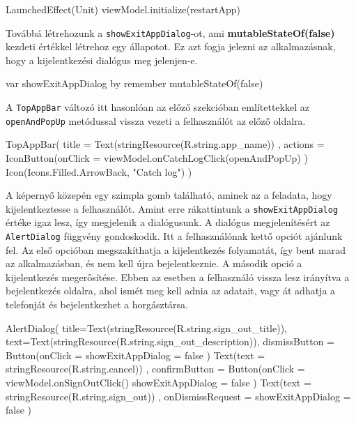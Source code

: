 \begin{java}
LaunchedEffect(Unit) { viewModel.initialize(restartApp) }
\end{java}

Továbbá létrehozunk a \texttt{showExitAppDialog}-ot, ami \textbf{mutableStateOf(false)} kezdeti értékkel létrehoz egy állapotot. Ez azt fogja jelezni az alkalmazásnak, hogy a kijelentkezési dialógus meg jelenjen-e.

\begin{java}
var showExitAppDialog by remember { mutableStateOf(false) }
\end{java}

A \texttt{TopAppBar} változó itt hasonlóan az előző szekcióban említettekkel az
\newline
\texttt{openAndPopUp}
metódussal vissza vezeti a felhasználót az előző oldalra.

\begin{java}
TopAppBar(
    title = { Text(stringResource(R.string.app_name)) },
    actions = {
        IconButton(onClick = { 
            viewModel.onCatchLogClick(openAndPopUp) }) {
            Icon(Icons.Filled.ArrowBack, "Catch log")
        }
    }
)
\end{java}

A képernyő közepén egy szimpla gomb található, aminek az a feladata, hogy kijelentkeztesse a felhasználót. Amint erre rákattintunk a \texttt{showExitAppDialog} értéke igaz lesz, így megjelenik a dialógusunk.
\newpage
A dialógus megjelenítésért az \texttt{AlertDialog} függvény gondoskodik. Itt a felhasználónak kettő opciót ajánlunk fel. Az első opcióban megszakíthatja a kijelentkezés folyamatát, így bent marad az alkalmazásban, és nem kell újra bejelentkeznie. A második opció a kijelentkezés megerősítése. Ebben az esetben a felhasználó vissza lesz irányítva a bejelentkezés oldalra, ahol ismét meg kell adnia az adatait, vagy át adhatja a telefonját és bejelentkezhet a horgásztársa.

\begin{java}
AlertDialog(
    title={Text(stringResource(R.string.sign_out_title))},
    text={Text(stringResource(R.string.sign_out_description))},
    dismissButton = {
        Button(onClick = { showExitAppDialog = false }) {
            Text(text = stringResource(R.string.cancel))
        }
    },
    confirmButton = {
        Button(onClick = {
            viewModel.onSignOutClick()
            showExitAppDialog = false
        }) {
            Text(text = stringResource(R.string.sign_out))
        }
    },
    onDismissRequest = { showExitAppDialog = false }
)
\end{java}